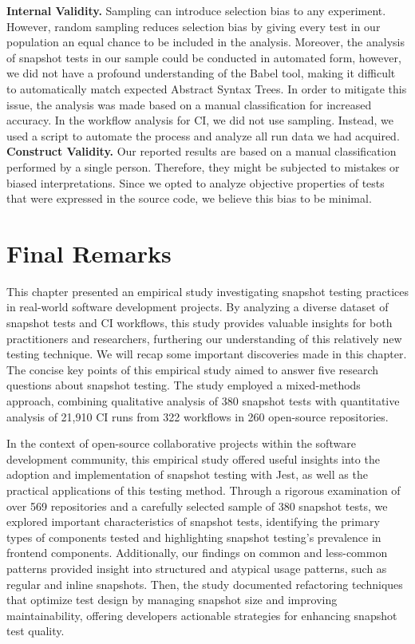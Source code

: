 \documentclass[
	msc, %
	english %
]{../ppgccufmg}
\begin{document}
        \noindent \textbf{Internal Validity.} Sampling can introduce selection bias to any experiment. However, random sampling reduces selection bias by giving every test in our population an equal chance to be included in the analysis.
        Moreover, the analysis of snapshot tests in our sample could be conducted in automated form, however, we did not have a profound understanding of the Babel tool, making it difficult to automatically match expected Abstract Syntax Trees. In order to mitigate this issue, the analysis was made based on a manual classification for increased accuracy.
        In the workflow analysis for CI, we did not use sampling. Instead, we used a script to automate the process and analyze all run data we had acquired.\\
        
        \noindent \textbf{Construct Validity.} Our reported results are based on a manual classification performed by a single person. Therefore, they might be subjected to mistakes or biased interpretations. Since we opted to analyze objective properties of tests that were expressed in the source code, we believe this bias to be minimal.
        
        \section{Final Remarks}\label{sec:ch4-final-remarks}

        This chapter presented an empirical study investigating snapshot testing practices in real-world software development projects. By analyzing a diverse dataset of snapshot tests and CI workflows, this study provides valuable insights for both practitioners and researchers, furthering our understanding of this relatively new testing technique. We will recap some important discoveries made in this chapter. The concise key points of this empirical study aimed to answer five research questions about snapshot testing. The study employed a mixed-methods approach, combining qualitative analysis of 380 snapshot tests with quantitative analysis of 21,910 CI runs from 322 workflows in 260 open-source repositories.

        In the context of open-source collaborative projects within the software development community, this empirical study offered useful insights into the adoption and implementation of snapshot testing with Jest, as well as the practical applications of this testing method. Through a rigorous examination of over 569 repositories and a carefully selected sample of 380 snapshot tests, we explored important characteristics of snapshot tests, identifying the primary types of components tested and highlighting snapshot testing’s prevalence in frontend components. Additionally, our findings on common and less-common patterns provided insight into structured and atypical usage patterns, such as regular and inline snapshots. Then, the study documented refactoring techniques that optimize test design by managing snapshot size and improving maintainability, offering developers actionable strategies for enhancing snapshot test quality.
\end{document}
